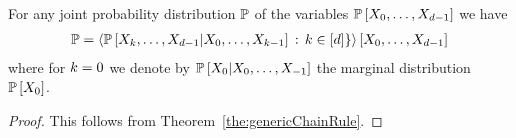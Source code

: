 \begin{theorem}\label{the:chainRule}
	For any joint probability distribution $\mathbb{P}$ of the variables $\mathbb{P}\left[X_{0},\ldots,X_{d-1}\right]$ we have
	\begin{align*}
		\mathbb{P} = \left\langle \mathbb{P}\left[X_{k},\ldots,X_{d-1}|X_{0},\ldots,X_{k-1}\right]\, : \, k\in[d]\}\right\rangle \left[ X_{0},\ldots,X_{d-1} \right] 
	\end{align*}
	where for $k=0$ we denote by $ \mathbb{P}\left[X_{0}|X_{0},\ldots,X_{-1}\right]$ the marginal distribution $\mathbb{P}\left[X_{0}\right]$.
\end{theorem}
\begin{proof}
	This follows from Theorem~\ref{the:genericChainRule}.
\end{proof}






